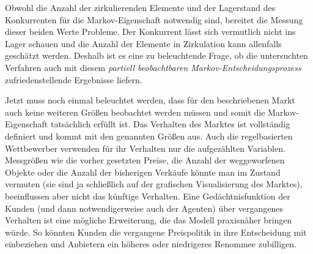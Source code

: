 Obwohl die Anzahl der zirkulierenden Elemente und der Lagerstand des Konkurrenten für die Markov-Eigenschaft notwendig sind, bereitet die Messung dieser beiden Werte Probleme.
Der Konkurrent lässt sich vermutlich nicht ins Lager schauen und die Anzahl der Elemente in Zirkulation kann allenfalls geschätzt werden.
Deshalb ist es eine zu beleuchtende Frage, ob die untersuchten Verfahren auch mit diesem \textit{partiell beobachtbaren Markov-Entscheidungsprozess} zufriedenstellende Ergebnisse liefern.

Jetzt muss noch einmal beleuchtet werden, dass für den beschriebenen Markt auch keine weiteren Größen beobachtet werden müssen und somit die Markov-Eigenschaft tatsächlich erfüllt ist.
Das Verhalten des Marktes ist vollständig definiert und kommt mit den genannten Größen aus.
Auch die regelbasierten Wettbewerber verwenden für ihr Verhalten nur die aufgezählten Variablen.
Messgrößen wie die vorher gesetzten Preise, die Anzahl der weggeworfenen Objekte oder die Anzahl der bisherigen Verkäufe könnte man im Zustand vermuten (sie sind ja schließlich auf der grafischen Visualisierung des Marktes), beeinflussen aber nicht das künftige Verhalten.
Eine Gedächtnisfunktion der Kunden (und dann notwendigerweise auch der Agenten) über vergangenes Verhalten ist eine mögliche Erweiterung, die das Modell praxisnäher bringen würde.
So könnten Kunden die vergangene Preispolitik in ihre Entscheidung mit einbeziehen und Anbietern ein höheres oder niedrigeres Renommee zubilligen.

